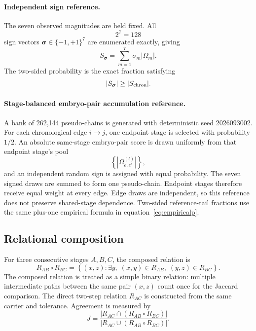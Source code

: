 \documentclass[11pt]{article}
\begin{document}
\paragraph{Independent sign reference.}
The seven observed magnitudes are held fixed. All
\[
2^7=128
\]
sign vectors \(\boldsymbol\sigma\in\{-1,+1\}^7\) are enumerated exactly, giving
\[
S_{\boldsymbol\sigma}
=
\sum_{m=1}^{7}
\sigma_m|\Omega_m|.
\]
The two-sided probability is the exact fraction satisfying
\[
|S_{\boldsymbol\sigma}|
\ge
|S_{\rm chron}|.
\]

\paragraph{Stage-balanced embryo-pair accumulation reference.}
A bank of 262,144 pseudo-chains is generated with deterministic seed 2026093002. For each chronological edge \(i\rightarrow j\), one endpoint stage is selected with probability \(1/2\). An absolute same-stage embryo-pair score is drawn uniformly from that endpoint stage's pool
\[
\left\{
|\Omega_{e,e'}^{(t)}|
\right\},
\]
and an independent random sign is assigned with equal probability. The seven signed draws are summed to form one pseudo-chain. Endpoint stages therefore receive equal weight at every edge. Edge draws are independent, so this reference does not preserve shared-stage dependence. Two-sided reference-tail fractions use the same plus-one empirical formula in equation~\eqref{eq:empiricalp}.

\subsection{Relational composition}

For three consecutive stages \(A,B,C\), the composed relation is
\begin{equation}
R_{AB}\circ R_{BC}
=
\left\{
(x,z):
\exists y,\;
(x,y)\in R_{AB},\;
(y,z)\in R_{BC}
\right\}.
\label{eq:composition}
\end{equation}
The composed relation is treated as a simple binary relation: multiple intermediate paths between the same pair \((x,z)\) count once for the Jaccard comparison. The direct two-step relation \(R_{AC}\) is constructed from the same carrier and tolerance. Agreement is measured by
\begin{equation}
J
=
\frac{
|R_{AC}\cap(R_{AB}\circ R_{BC})|
}{
|R_{AC}\cup(R_{AB}\circ R_{BC})|
}.
\label{eq:compositionjaccard}
\end{equation}
\end{document}
